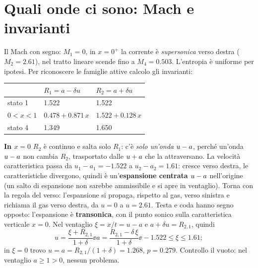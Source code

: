 \section*{Quali onde ci sono: Mach e invarianti}
Il Mach con segno: $M_1=0$, in $x=0^+$ la corrente è \emph{supersonica} verso destra ($M_2=\num{2.61}$), nel tratto
lineare scende fino a $M_4=\num{0.503}$. L'entropia è uniforme per ipotesi. Per riconoscere le famiglie attive
calcolo gli invarianti:
\begin{table}[H]
  \centering
  \begin{tabular}{lll}
    \toprule
    & $R_1=a-\delta u$ & $R_2=a+\delta u$ \\
    \midrule
    stato 1 & \num{1.522} & \num{1.522} \\
    $0<x<1$ & $\num{0.478}+\num{0.871}\,x$ & $\num{1.522}+\num{0.128}\,x$ \\
    stato 4 & \num{1.349} & \num{1.650} \\
    \bottomrule
  \end{tabular}
\end{table}

\textbf{In $x=0$} $R_2$ è continuo e salta solo $R_1$: c'è \emph{solo un'onda $u-a$}, perché un'onda $u-a$ non
cambia $R_2$, trasportato dalle $u+a$ che la attraversano. La velocità caratteristica passa da $u_1-a_1=-\num{1.522}$
a $u_2-a_2=\num{1.61}$: cresce verso destra, le caratteristiche divergono, quindi è un'\textbf{espansione centrata
$u-a$} nell'origine (un salto di espansione non sarebbe ammissibile e si apre in ventaglio). Torna con la regola del
verso: l'espansione si propaga, rispetto al gas, verso sinistra e richiama il gas verso destra, da $u=0$ a
$u=\num{2.61}$. Testa e coda hanno segno opposto: l'espansione è \textbf{transonica}, con il punto sonico sulla
caratteristica verticale $x=0$. Nel ventaglio $\xi=x/t=u-a$ e $a+\delta u=R_{2,1}$, quindi
\[
u=\frac{\xi+R_{2,1}}{1+\delta}\ee a=\frac{R_{2,1}-\delta\,\xi}{1+\delta}\ee
-\num{1.522}\le\xi\le\num{1.61};
\]
in $\xi=0$ trovo $u=a=R_{2,1}/(1+\delta)=\num{1.268}$, $p=\num{0.279}$. Controllo il vuoto: nel ventaglio
$a\ge1>0$, nessun problema.

